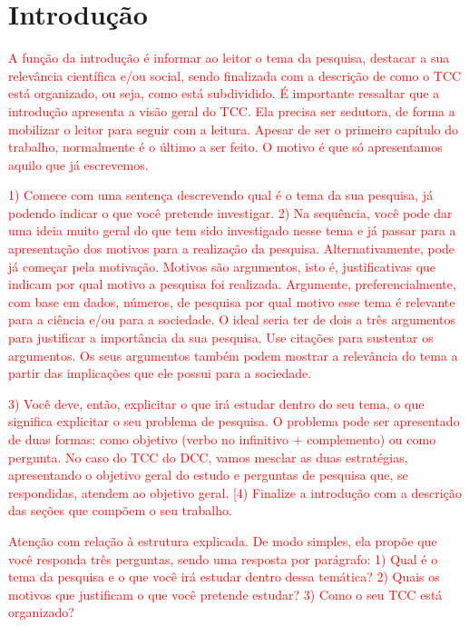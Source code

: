 \section{Introdução}
\label{sec:introducao}



\textcolor{red}{A função da introdução é informar ao leitor o tema da pesquisa, destacar a sua relevância científica e/ou social, sendo finalizada com a descrição de como o TCC está organizado, ou seja, como está subdividido. É importante ressaltar que a introdução apresenta a visão geral do TCC. Ela precisa ser sedutora, de forma a mobilizar o leitor para seguir com a leitura. Apesar de ser o primeiro capítulo do trabalho, normalmente é o último a ser feito. O motivo é que só apresentamos aquilo que já escrevemos.}

\textcolor{red}{1) Comece com uma sentença descrevendo qual é o tema da sua pesquisa, já podendo indicar o que você pretende investigar. 2) Na sequência, você pode dar uma ideia muito geral do que tem sido investigado nesse tema e já passar para a apresentação dos motivos para a realização da pesquisa. Alternativamente, pode já começar pela motivação. Motivos são argumentos, isto é, justificativas que indicam por qual motivo a pesquisa foi realizada. Argumente, preferencialmente, com base em dados, números, de pesquisa por qual motivo esse tema é relevante para a ciência e/ou para a sociedade. O ideal seria ter de dois a três argumentos para justificar a importância da sua pesquisa. Use citações para sustentar os argumentos. Os seus argumentos também podem mostrar a relevância do tema a partir das implicações que ele possui para a sociedade.}

\textcolor{red}{3) Você deve, então, explicitar o que irá estudar dentro do seu tema, o que significa explicitar o seu problema de pesquisa. O problema pode ser apresentado de duas formas: como objetivo (verbo no infinitivo + complemento) ou como pergunta. No caso do TCC do DCC, vamos mesclar as duas estratégias, apresentando o objetivo geral do estudo e perguntas de pesquisa que, se respondidas, atendem ao objetivo geral.
[4) Finalize a introdução com a descrição das seções que compõem o seu trabalho.}

\textcolor{red}{Atenção com relação à estrutura explicada. De modo simples, ela propõe que você responda três perguntas, sendo uma resposta por parágrafo: 1) Qual é o tema da pesquisa e o que você irá estudar dentro dessa temática? 2) Quais os motivos que justificam o que você pretende estudar? 3) Como o seu TCC está organizado?}

